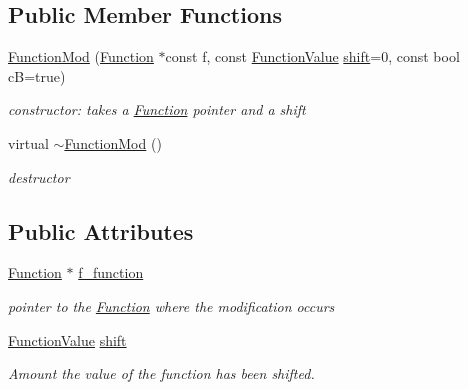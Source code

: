 \subsection*{Public Member Functions}
\begin{DoxyCompactItemize}
\item 
\mbox{\hyperlink{class_s_m_spp__di__unipi__it_1_1_function_mod_a311cc97015658a8f6479f754730c65ed}{Function\+Mod}} (\mbox{\hyperlink{class_s_m_spp__di__unipi__it_1_1_function}{Function}} $\ast$const f, const \mbox{\hyperlink{class_s_m_spp__di__unipi__it_1_1_function_mod_a44f54e31f9fa8a29194218c234876284}{Function\+Value}} \mbox{\hyperlink{class_s_m_spp__di__unipi__it_1_1_function_mod_a177a0111cf0d0fdc5409df06c3b5e282}{shift}}=0, const bool cB=true)
\begin{DoxyCompactList}\small\item\em constructor\+: takes a \mbox{\hyperlink{class_s_m_spp__di__unipi__it_1_1_function}{Function}} pointer and a shift \end{DoxyCompactList}\item 
\mbox{\label{class_s_m_spp__di__unipi__it_1_1_function_mod_a37f5d0f2b36bdf19fe4ee8b8d877a71a}} 
virtual \mbox{\hyperlink{class_s_m_spp__di__unipi__it_1_1_function_mod_a37f5d0f2b36bdf19fe4ee8b8d877a71a}{$\sim$\+Function\+Mod}} ()
\begin{DoxyCompactList}\small\item\em destructor \end{DoxyCompactList}\end{DoxyCompactItemize}
\subsection*{Public Attributes}
\begin{DoxyCompactItemize}
\item 
\mbox{\label{class_s_m_spp__di__unipi__it_1_1_function_mod_aad441c18d749a7928722b8418dbcb678}} 
\mbox{\hyperlink{class_s_m_spp__di__unipi__it_1_1_function}{Function}} $\ast$ \mbox{\hyperlink{class_s_m_spp__di__unipi__it_1_1_function_mod_aad441c18d749a7928722b8418dbcb678}{f\+\_\+function}}
\begin{DoxyCompactList}\small\item\em pointer to the \mbox{\hyperlink{class_s_m_spp__di__unipi__it_1_1_function}{Function}} where the modification occurs \end{DoxyCompactList}\item 
\mbox{\hyperlink{class_s_m_spp__di__unipi__it_1_1_function_mod_a44f54e31f9fa8a29194218c234876284}{Function\+Value}} \mbox{\hyperlink{class_s_m_spp__di__unipi__it_1_1_function_mod_a177a0111cf0d0fdc5409df06c3b5e282}{shift}}
\begin{DoxyCompactList}\small\item\em Amount the value of the function has been shifted. \end{DoxyCompactList}\end{DoxyCompactItemize}
